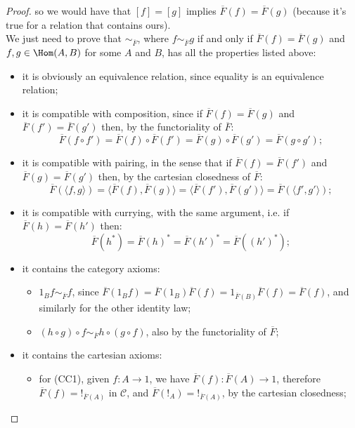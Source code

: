 \begin{proof}
    so we would have that $[f] = [g]$ implies $\overline F(f) = \overline F(g)$ (because it's true for a relation that contains ours).\\
    We just need to prove that $\sim_{\overline F}$, where $f \sim_{\overline F} g$ if and only if $\overline F(f) = \overline F(g)$ and $f,g \in \Hom(A,B)$ for some $A$ and $B$, has all the properties listed above:
    \begin{itemize}
        \item it is obviously an equivalence relation, since equality is an equivalence relation;
        \item it is compatible with composition, since if $\overline F(f) = \overline F(g)$ and $\overline F(f') = \overline F(g')$ then, by the functoriality of $\overline F$:
        \[ \overline F(f \circ f') = \overline F(f) \circ \overline F(f') = \overline F(g) \circ \overline F(g') = \overline F(g \circ g');\]
        \item it is compatible with pairing, in the sense that if $\overline F(f) = \overline F(f')$ and $\overline F(g) = \overline F(g')$ then, by the cartesian closedness of $\overline F$:
        \[ \overline F(\langle f,g\rangle) = \langle \overline F(f), \overline F(g)\rangle = \langle \overline F(f'), \overline F(g')\rangle = \overline F(\langle f',g'\rangle);\]
        \item it is compatible with currying, with the same argument, i.e. if $\overline F(h) = \overline F(h')$ then:
        \[ \overline F(h^*) = \overline F(h)^* = \overline F(h')^* = \overline F((h')^*);\]
        \item it contains the category axioms:
        \begin{itemize}[label=$\ast$]
            \item $1_Bf \sim_{\overline F} f$, since $\overline F(1_Bf) = \overline F(1_B)\overline F(f) = 1_{\overline F(B)}\overline F(f) = \overline F(f)$, and similarly for the other identity law;
            \item $(h \circ g) \circ f \sim_{\overline F} h \circ (g \circ f)$, also by the functoriality of $\overline F$;
        \end{itemize}
        \item it contains the cartesian axioms:
        \begin{itemize}[label=$\ast$]
            \item for (CC1), given $f : A \to 1$, we have $\overline F(f) : \overline F(A) \to 1$, therefore $\overline F(f) = !_{\overline F(A)}$ in $\mathcal C$, and $\overline F(!_A) = !_{\overline F(A)}$, by the cartesian closedness;

\end{itemize}
\end{itemize}
\end{proof}

